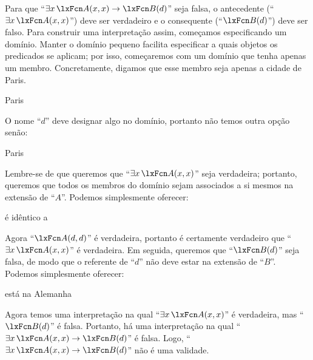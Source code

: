 Para que \textquotedblleft $\exists x\,\atom{A}{x,x} \eif \atom{B}{d}$\textquotedblright{} seja falsa, o antecedente (\textquotedblleft $\exists x\, \atom{A}{x,x}$\textquotedblright{}) deve ser verdadeiro e o consequente (\textquotedblleft $\atom{B}{d}$\textquotedblright{}) deve ser falso. Para construir uma interpretação assim, começamos especificando um domínio. Manter o domínio pequeno facilita especificar a quais objetos os predicados se aplicam; por isso, começaremos com um domínio que tenha apenas um membro. Concretamente, digamos que esse membro seja apenas a cidade de Paris.
	\begin{ekey}
\item[\text{domínio}] Paris
	\end{ekey}
O nome \textquotedblleft $d$\textquotedblright{} deve designar algo no domínio, portanto não temos outra opção senão:
	\begin{ekey}
		\item[d] Paris
	\end{ekey}
Lembre-se de que queremos que \textquotedblleft $\exists x\, \atom{A}{x,x}$\textquotedblright{} seja verdadeira; portanto, queremos que todos os membros do domínio sejam associados a si mesmos na extensão de \textquotedblleft $A$\textquotedblright{}. Podemos simplesmente oferecer:
	\begin{ekey}
\item[\atom{A}{x,y}]  é idêntico a 
	\end{ekey}
Agora \textquotedblleft $\atom{A}{d,d}$\textquotedblright{} é verdadeira, portanto é certamente verdadeiro que \textquotedblleft $\exists x\, \atom{A}{x,x}$\textquotedblright{} é verdadeira. Em seguida, queremos que \textquotedblleft $\atom{B}{d}$\textquotedblright{} seja falsa, de modo que o referente de \textquotedblleft $d$\textquotedblright{} não deve estar na extensão de \textquotedblleft $B$\textquotedblright{}. Podemos simplesmente oferecer:
	\begin{ekey}
\item[\atom{B}{x}]  está na Alemanha
	\end{ekey}
Agora temos uma interpretação na qual \textquotedblleft $\exists x\, \atom{A}{x,x}$\textquotedblright{} é verdadeira, mas \textquotedblleft $\atom{B}{d}$\textquotedblright{} é falsa. Portanto, há uma interpretação na qual \textquotedblleft $\exists x\, \atom{A}{x,x} \eif \atom{B}{d}$\textquotedblright{} é falsa. Logo, \textquotedblleft $\exists x\, \atom{A}{x,x} \eif \atom{B}{d}$\textquotedblright{} não é uma validade.

